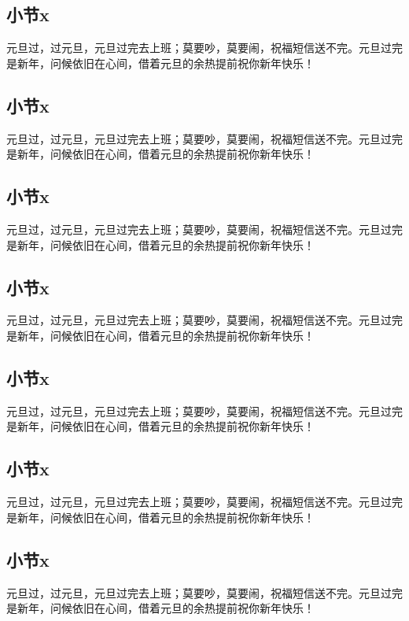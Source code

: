 \subsection{小节x}

元旦过，过元旦，元旦过完去上班；莫要吵，莫要闹，祝福短信送不完。元旦过完是新年，问候依旧在心间，借着元旦的余热提前祝你新年快乐！

\subsection{小节x}

元旦过，过元旦，元旦过完去上班；莫要吵，莫要闹，祝福短信送不完。元旦过完是新年，问候依旧在心间，借着元旦的余热提前祝你新年快乐！

\subsection{小节x}

元旦过，过元旦，元旦过完去上班；莫要吵，莫要闹，祝福短信送不完。元旦过完是新年，问候依旧在心间，借着元旦的余热提前祝你新年快乐！

\subsection{小节x}

元旦过，过元旦，元旦过完去上班；莫要吵，莫要闹，祝福短信送不完。元旦过完是新年，问候依旧在心间，借着元旦的余热提前祝你新年快乐！

\subsection{小节x}

元旦过，过元旦，元旦过完去上班；莫要吵，莫要闹，祝福短信送不完。元旦过完是新年，问候依旧在心间，借着元旦的余热提前祝你新年快乐！

\subsection{小节x}

元旦过，过元旦，元旦过完去上班；莫要吵，莫要闹，祝福短信送不完。元旦过完是新年，问候依旧在心间，借着元旦的余热提前祝你新年快乐！

\subsection{小节x}

元旦过，过元旦，元旦过完去上班；莫要吵，莫要闹，祝福短信送不完。元旦过完是新年，问候依旧在心间，借着元旦的余热提前祝你新年快乐！

